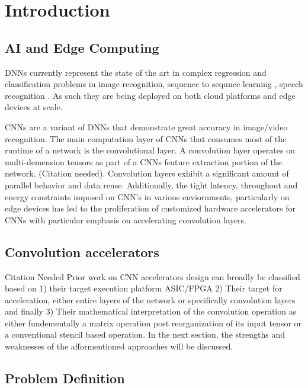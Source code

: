 
\chapter{Introduction}

\section{AI and Edge Computing}
\label{chap:intro:ai_and_edge}

\ac{DNN}s currently represent the state of the art in complex regression and
classification problems in image recognition, sequence to sequnce learning
\cite{dnn_is_sota_seq2seq}, speech recognition \cite{dnn_is_sota_speech}. As
such they are being deployed on both cloud platforms and edge devices at scale.

\ac{CNN}s are a variant of \ac{DNN}s that demonstrate great accuracy in
image/video recognition. The main computation layer of \ac{CNN}s that consumes
most of the runtime of a network is the convolutional layer. A convolution layer
operates on multi-demension tensors as part of a \ac{CNN}s feature extraction
portion of the network. (Citation needed). Convolution layers exhibit a
significant amount of parallel behavior and data reuse. Additionally, the tight
latency, throughout and energy constraints imposed on CNN's in various
enviornments, particularly on edge devices has led to the proliferation of
customized hardware accelerators for \ac{CNN}s with particular emphasis on
accelerating convolution layers. 


\section{Convolution accelerators}
\label{chap:intro:cnn_accelerator_design_approaches}

Citation Needed Prior work on \ac{CNN} accelerators design can broadly be
classified based on 1) their target execution platform \ac{ASIC}/\ac{FPGA} 2)
Their target for acceleration, either entire layers of the network or
specifically convolution layers and finally 3) Their mathematical interpretation
of the convolution operation as either fundementally a matrix operation post
reorganization of its input tensor or a conventional stencil based operation. In
the next section, the strengths and weaknesses of the afformentioned approaches
will be discussed.

\section{Problem Definition}
\label{chap:intro:prob_def}

